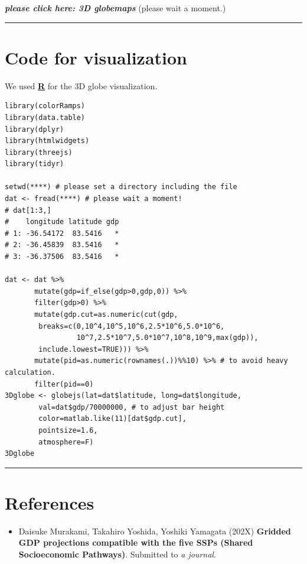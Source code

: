 \documentclass[]{book}
\providecommand{\tightlist}{%
  \setlength{\itemsep}{0pt}\setlength{\parskip}{0pt}}
\begin{document}
\textbf{\emph{please click here: 3D globemaps}} (please wait a moment.)

\begin{center}\rule{0.5\linewidth}{\linethickness}\end{center}

\hypertarget{code-for-visualization}{%
\section*{Code for visualization}\label{code-for-visualization}}

We used \href{https://www.r-project.org/}{\textbf{R}} for the 3D globe visualization.

\begin{verbatim}
library(colorRamps)
library(data.table)
library(dplyr)
library(htmlwidgets)
library(threejs)
library(tidyr)

setwd(****) # please set a directory including the file
dat <- fread(****) # please wait a moment!
# dat[1:3,]
#    longitude latitude gdp
# 1: -36.54172  83.5416   *
# 2: -36.45839  83.5416   *
# 3: -36.37506  83.5416   *

dat <- dat %>%
       mutate(gdp=if_else(gdp>0,gdp,0)) %>%
       filter(gdp>0) %>%
       mutate(gdp.cut=as.numeric(cut(gdp,
        breaks=c(0,10^4,10^5,10^6,2.5*10^6,5.0*10^6,
                 10^7,2.5*10^7,5.0*10^7,10^8,10^9,max(gdp)), 
        include.lowest=TRUE))) %>%
       mutate(pid=as.numeric(rownames(.))%%10) %>% # to avoid heavy calculation.
       filter(pid==0)
3Dglobe <- globejs(lat=dat$latitude, long=dat$longitude,
        val=dat$gdp/70000000, # to adjust bar height 
        color=matlab.like(11)[dat$gdp.cut],
        pointsize=1.6,
        atmosphere=F)
3Dglobe        
\end{verbatim}

\begin{center}\rule{0.5\linewidth}{\linethickness}\end{center}

\hypertarget{references}{%
\section*{References}\label{references}}

\begin{itemize}
\tightlist
\item
  Daisuke Murakami, Takahiro Yoshida, Yoshiki Yamagata (202X) \textbf{Gridded GDP projections compatible with the five SSPs (Shared Socioeconomic Pathways)}. Submitted to \emph{a journal}.
\end{itemize}


\end{document}
